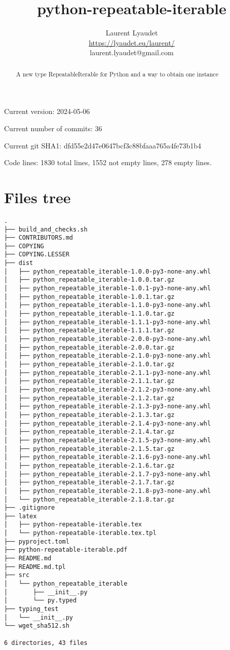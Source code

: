 \documentclass{article}
\begin{document}
\author{
  Laurent Lyaudet\\
  \url{https://lyaudet.eu/laurent/}\\
  laurent.lyaudet@gmail.com
}
\title{python-repeatable-iterable}

\maketitle
\begin{abstract}
A new type RepeatableIterable for Python
and a way to obtain one instance
\end{abstract}

Current version: 2024-05-06

Current number of commits: 36

Current git SHA1: dfd55e2d47e0647bcf3c88bfaaa765a4fe73b1b4

Code lines: 1830 total lines, 1552 not empty lines, 278 empty lines.

\section{Files tree}
\label{section:tree}

\begin{verbatim}
.
├── build_and_checks.sh
├── CONTRIBUTORS.md
├── COPYING
├── COPYING.LESSER
├── dist
│   ├── python_repeatable_iterable-1.0.0-py3-none-any.whl
│   ├── python_repeatable_iterable-1.0.0.tar.gz
│   ├── python_repeatable_iterable-1.0.1-py3-none-any.whl
│   ├── python_repeatable_iterable-1.0.1.tar.gz
│   ├── python_repeatable_iterable-1.1.0-py3-none-any.whl
│   ├── python_repeatable_iterable-1.1.0.tar.gz
│   ├── python_repeatable_iterable-1.1.1-py3-none-any.whl
│   ├── python_repeatable_iterable-1.1.1.tar.gz
│   ├── python_repeatable_iterable-2.0.0-py3-none-any.whl
│   ├── python_repeatable_iterable-2.0.0.tar.gz
│   ├── python_repeatable_iterable-2.1.0-py3-none-any.whl
│   ├── python_repeatable_iterable-2.1.0.tar.gz
│   ├── python_repeatable_iterable-2.1.1-py3-none-any.whl
│   ├── python_repeatable_iterable-2.1.1.tar.gz
│   ├── python_repeatable_iterable-2.1.2-py3-none-any.whl
│   ├── python_repeatable_iterable-2.1.2.tar.gz
│   ├── python_repeatable_iterable-2.1.3-py3-none-any.whl
│   ├── python_repeatable_iterable-2.1.3.tar.gz
│   ├── python_repeatable_iterable-2.1.4-py3-none-any.whl
│   ├── python_repeatable_iterable-2.1.4.tar.gz
│   ├── python_repeatable_iterable-2.1.5-py3-none-any.whl
│   ├── python_repeatable_iterable-2.1.5.tar.gz
│   ├── python_repeatable_iterable-2.1.6-py3-none-any.whl
│   ├── python_repeatable_iterable-2.1.6.tar.gz
│   ├── python_repeatable_iterable-2.1.7-py3-none-any.whl
│   ├── python_repeatable_iterable-2.1.7.tar.gz
│   ├── python_repeatable_iterable-2.1.8-py3-none-any.whl
│   └── python_repeatable_iterable-2.1.8.tar.gz
├── .gitignore
├── latex
│   ├── python-repeatable-iterable.tex
│   └── python-repeatable-iterable.tex.tpl
├── pyproject.toml
├── python-repeatable-iterable.pdf
├── README.md
├── README.md.tpl
├── src
│   └── python_repeatable_iterable
│       ├── __init__.py
│       └── py.typed
├── typing_test
│   └── __init__.py
└── wget_sha512.sh

6 directories, 43 files
\end{verbatim}
\end{document}
